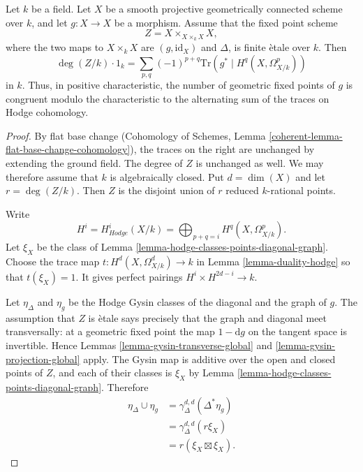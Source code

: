 \begin{lemma}
\label{lemma-hodge-fixed-point-formula}
Let $k$ be a field. Let $X$ be a smooth projective geometrically connected
scheme over $k$, and let $g : X \to X$ be a morphism. Assume that the
fixed point scheme
$$
Z = X \times_{X \times_k X} X,
$$
where the two maps to $X \times_k X$ are $(g, \text{id}_X)$ and $\Delta$,
is finite \`etale over $k$. Then
$$
\deg(Z/k) \cdot 1_k =
\sum_{p, q} (-1)^{p + q}
\text{Tr}\left(g^* \mid H^q(X, \Omega^p_{X/k})\right)
$$
in $k$. Thus, in positive characteristic, the number of geometric fixed
points of $g$ is congruent modulo the characteristic to the alternating
sum of the traces on Hodge cohomology.
\end{lemma}

\begin{proof}
By flat base change (Cohomology of Schemes, Lemma
\ref{coherent-lemma-flat-base-change-cohomology}), the traces on the right
are unchanged by extending the ground field. The degree of $Z$ is unchanged
as well. We may therefore assume that $k$ is algebraically closed. Put
$d = \dim(X)$ and let $r = \deg(Z/k)$. Then $Z$ is the disjoint union of
$r$ reduced $k$-rational points.

\medskip\noindent
Write
$$
H^i = H^i_{Hodge}(X/k) =
\bigoplus_{p + q = i} H^q(X, \Omega^p_{X/k}).
$$
Let $\xi_X$ be the class of Lemma
\ref{lemma-hodge-classes-points-diagonal-graph}. Choose the trace map
$t : H^d(X, \Omega^d_{X/k}) \to k$ in
Lemma \ref{lemma-duality-hodge} so that $t(\xi_X) = 1$. It gives perfect
pairings $H^i \times H^{2d-i} \to k$.

\medskip\noindent
Let $\eta_\Delta$ and $\eta_g$ be the Hodge Gysin classes of the diagonal
and the graph of $g$. The assumption that $Z$ is \`etale says precisely
that the graph and diagonal meet transversally: at a geometric fixed point
the map $1 - \text{d}g$ on the tangent space is invertible. Hence
Lemmas \ref{lemma-gysin-transverse-global} and
\ref{lemma-gysin-projection-global} apply. The Gysin map is additive over
the open and closed points of $Z$, and each of their classes is $\xi_X$ by
Lemma \ref{lemma-hodge-classes-points-diagonal-graph}. Therefore
\begin{align*}
\eta_\Delta \cup \eta_g
& = \gamma^{d, d}_\Delta(\Delta^*\eta_g) \\
& = \gamma^{d, d}_\Delta(r\xi_X) \\
& = r(\xi_X \boxtimes \xi_X).
\end{align*}


\end{proof}
